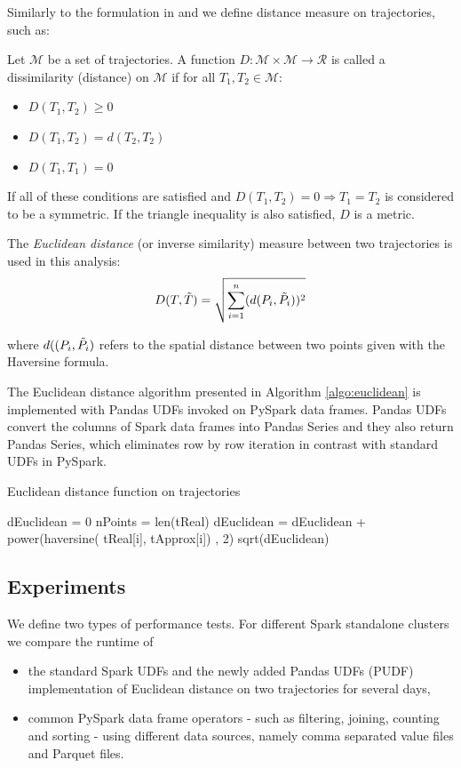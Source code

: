 Similarly to the formulation in \cite{encyclopedia} and \cite{distance-def} we define distance measure on trajectories, such as:
\begin{definition}
Let $\mathcal{M}$ be a set of trajectories. A function $D :\mathcal{M} \times \mathcal{M} \rightarrow \mathcal{R}$  is called a dissimilarity (distance) on $\mathcal{M}$ if for all $T_{1}, T_{2} \in \mathcal{M}$: 
\begin{itemize}
    \item $D(T_{1},T_{2}) \geqslant 0$
    \item $D(T_{1},T_{2}) = d(T_{2},T_{2})$
    \item $D(T_{1},T_{1}) = 0$
\end{itemize}
If all of these conditions are satisfied and $D(T_{1}, T_{2}) = 0 \Rightarrow  T_{1} = T_{2} $ is considered to be a symmetric. If
the triangle inequality is also satisfied, $D$ is a metric.
\end{definition}

The \textit{Euclidean distance} (or inverse similarity) measure between two trajectories is used in this analysis:
\[D(T,\Tilde{T}) = \sqrt{\sum_{i=1}^{n} (d(P_{i},\Tilde{P_{i}}))^{2}}\]

where $d((P_{i},\Tilde{P_{i}})$ refers to the spatial distance between two points given with the Haversine formula.

The Euclidean distance algorithm presented in Algorithm \ref{algo:euclidean} is implemented with Pandas UDFs invoked on PySpark data frames. Pandas UDFs convert the columns of Spark data frames into Pandas Series and they also return Pandas Series, which eliminates row by row iteration in contrast with standard UDFs in PySpark.

\begin{algorithm}
\begin{algorithmic}
\caption{Euclidean distance function on trajectories} \label{algo:euclidean}
\State dEuclidean = 0
\State nPoints = len(tReal) 
    \State dEuclidean = dEuclidean + power(haversine(     
    \State tReal[i], tApprox[i]) , 2)
\EndFor
\Return sqrt(dEuclidean)
\EndFunction
\end{algorithmic}
\end{algorithm}


\subsection{Experiments}
We define two types of performance tests. For different Spark standalone clusters we compare the runtime of
\begin{itemize}
    \item the standard Spark UDFs and the newly added Pandas UDFs (PUDF) implementation of Euclidean distance on two trajectories for several days,
    \item common PySpark data frame operators - such as filtering, joining, counting and sorting - using different data sources, namely comma separated value files and Parquet files. 
\end{itemize}

